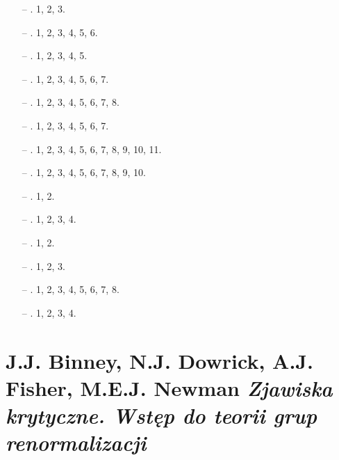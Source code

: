 \documentclass[a4paper,11pt]{article}
\numberwithin{equation}{section}
\begin{document}
\begin{itemize}

\item[--]  . 1, 2, 3.
\item[--]  . 1, 2, 3, 4, 5, 6.
\item[--]  . 1, 2, 3, 4, 5.
\item[--]  . 1, 2, 3, 4, 5, 6, 7.
\item[--]  . 1, 2, 3, 4, 5, 6, 7, 8.
\item[--]  . 1, 2, 3, 4, 5, 6, 7.
\item[--]  . 1, 2, 3, 4, 5, 6, 7, 8, 9, 10, 11.
\item[--]  . 1, 2, 3, 4, 5, 6, 7, 8, 9, 10.
\item[--]  . 1, 2.
\item[--]  . 1, 2, 3, 4.
\item[--]  . 1, 2.
\item[--]  . 1, 2, 3.
\item[--]  . 1, 2, 3, 4, 5, 6, 7, 8.
\item[--]  . 1, 2, 3, 4.
\end{itemize}




\section{J.J. Binney, N.J. Dowrick, A.J. Fisher, M.E.J. Newman
  \textit{Zjawiska krytyczne. Wstęp do teorii grup
    renormalizacji}
}

\label{sec:Oznaczenia-i-konwencje}
\end{document}

